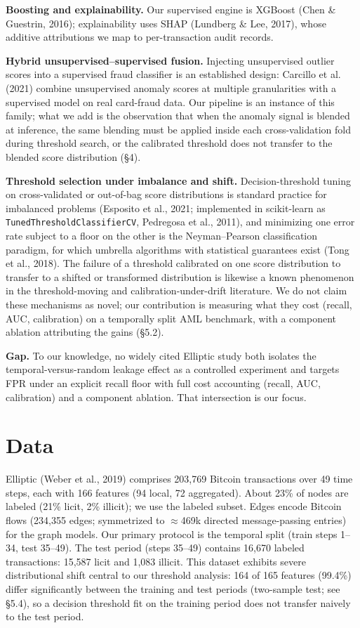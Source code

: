 \documentclass[11pt]{article}
\begin{document}
\textbf{Boosting and explainability.} Our supervised engine is XGBoost (Chen \& Guestrin, 2016); explainability uses SHAP (Lundberg \& Lee, 2017), whose additive attributions we map to per-transaction audit records.

\textbf{Hybrid unsupervised--supervised fusion.} Injecting unsupervised outlier scores into a supervised fraud classifier is an established design: Carcillo et al. (2021) combine unsupervised anomaly scores at multiple granularities with a supervised model on real card-fraud data. Our pipeline is an instance of this family; what we add is the observation that when the anomaly signal is blended at inference, the same blending must be applied inside each cross-validation fold during threshold search, or the calibrated threshold does not transfer to the blended score distribution (\S4).

\textbf{Threshold selection under imbalance and shift.} Decision-threshold tuning on cross-validated or out-of-bag score distributions is standard practice for imbalanced problems (Esposito et al., 2021; implemented in scikit-learn as \texttt{TunedThresholdClassifierCV}, Pedregosa et al., 2011), and minimizing one error rate subject to a floor on the other is the Neyman--Pearson classification paradigm, for which umbrella algorithms with statistical guarantees exist (Tong et al., 2018). The failure of a threshold calibrated on one score distribution to transfer to a shifted or transformed distribution is likewise a known phenomenon in the threshold-moving and calibration-under-drift literature. We do not claim these mechanisms as novel; our contribution is measuring what they cost (recall, AUC, calibration) on a temporally split AML benchmark, with a component ablation attributing the gains (\S5.2).

\textbf{Gap.} To our knowledge, no widely cited Elliptic study both isolates the temporal-versus-random leakage effect as a controlled experiment and targets FPR under an explicit recall floor with full cost accounting (recall, AUC, calibration) and a component ablation. That intersection is our focus.

\section{Data}

Elliptic (Weber et al., 2019) comprises 203,769 Bitcoin transactions over 49 time steps, each with 166 features (94 local, 72 aggregated). About 23\% of nodes are labeled (21\% licit, 2\% illicit); we use the labeled subset. Edges encode Bitcoin flows (234,355 edges; symmetrized to $\approx$469k directed message-passing entries) for the graph models. Our primary protocol is the temporal split (train steps 1--34, test 35--49). The test period (steps 35--49) contains 16,670 labeled transactions: 15,587 licit and 1,083 illicit. This dataset exhibits severe distributional shift central to our threshold analysis: 164 of 165 features (99.4\%) differ significantly between the training and test periods (two-sample test; see \S5.4), so a decision threshold fit on the training period does not transfer naively to the test period.
\end{document}
